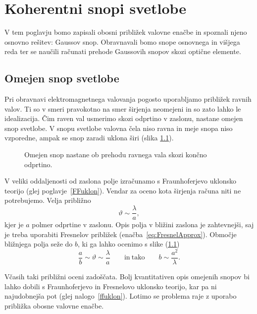 
\chapter{Koherentni snopi svetlobe}
V tem poglavju bomo zapisali obosni približek valovne enačbe in spoznali 
njeno osnovno rešitev: Gaussov snop. Obravnavali bomo snope osnovnega in višjega reda ter
se naučili računati prehode Gaussovih snopov skozi optične elemente. 

\section{Omejen snop svetlobe}
Pri obravnavi elektromagnetnega valovanja pogosto uporabljamo
približek ravnih valov. Ti so v smeri pravokotno na smer širjenja
neomejeni in so zato lahko le idealizacija. Čim raven val usmerimo skozi odprtino
v zaslonu, nastane omejen snop svetlobe. V snopu svetlobe valovna čela niso
ravna in meje snopa niso vzporedne, ampak se snop zaradi uklona širi 
(slika \ref{fig:Uklon-na-rezi}).
\begin{figure}[h]
\centering
\def\svgwidth{120truemm} 

\caption{Omejen snop nastane ob prehodu ravnega vala skozi končno odprtino.}
\label{fig:Uklon-na-rezi}
\end{figure}

V veliki oddaljenosti od zaslona polje izračunamo s
Fraunhoferjevo uklonsko teorijo (glej poglavje~\ref{FFuklon}). 
Vendar za oceno kota širjenja računa niti ne potrebujemo. Velja približno 
\begin{equation}
\vartheta\sim\frac{\lambda}{a},
\label{eq:kot_ocena}
\end{equation}
kjer je $a$ polmer odprtine v zaslonu.
Opis polja v bližini zaslona je zahtevnejši, saj je treba uporabiti 
Fresnelov približek (enačba~\ref{eq:FresnelApprox}).
Območje bližnjega polja seže do $b$, ki ga lahko ocenimo s slike (\ref{fig:Uklon-na-rezi})
\begin{equation}
\frac{a}{b}\sim{\vartheta}\sim \frac{\lambda}{a} \qquad \mathrm{in~tako} \qquad b\sim\frac{a^2}{\lambda}.
\label{eq:z_ocena}
\end{equation}

Včasih taki približni oceni zadoščata. Bolj kvantitativen opis omejenih
snopov bi lahko dobili s Fraunhoferjevo in Fresnelovo uklonsko teorijo,
kar pa ni najudobnejša pot (glej nalogo~\ref{ffuklon}). Lotimo se problema raje z 
uporabo približka obosne valovne enačbe.


